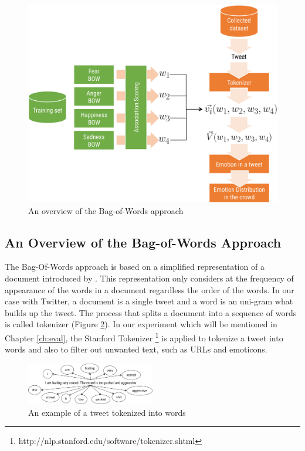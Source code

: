 \begin{figure}[htb!] 
\centering    
\includegraphics[width=1.0\textwidth]{BagOfWord}
\caption{An overview of the Bag-of-Words approach}
\label{fig:bagOfWord}
\end{figure}

\subsection{An Overview of the Bag-of-Words Approach}

The Bag-Of-Words approach is based on a simplified representation of a document introduced by \citet{joachims1996probabilistic}. This representation only considers at the frequency of appearance of the words in a document regardless the order of the words. In our case with Twitter, a document is a single tweet and a word is an uni-gram what builds up the tweet. The process that splits a document into a sequence of words is called tokenizer (Figure \ref{fig:tokenizer}). In our experiment which will be mentioned in Chapter \ref{ch:eval}, the Stanford Tokenizer \footnote{http://nlp.stanford.edu/software/tokenizer.shtml} is applied to tokenize a tweet into words and also to filter out unwanted text, such as URLs and emoticons.

\begin{figure}[htb!] 
\centering    
\includegraphics[width=0.5\textwidth]{Tokenizer}
\caption{An example of a tweet tokenized into words}
\label{fig:tokenizer}
\end{figure}

